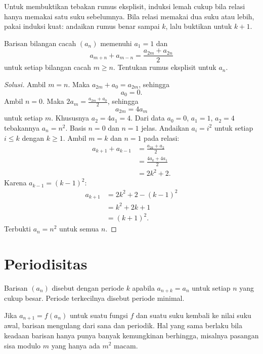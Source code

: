 \documentclass[12pt]{scrartcl}
\begin{document}
\begin{fact}
Untuk membuktikan tebakan rumus eksplisit, induksi lemah cukup bila relasi
hanya memakai satu suku sebelumnya. Bila relasi memakai dua suku atau lebih,
pakai induksi kuat: andaikan rumus benar sampai $k$, lalu buktikan untuk $k+1$.
\end{fact}

\begin{example}
Barisan bilangan cacah $(a_n)$ memenuhi $a_1 = 1$ dan
\[ a_{m+n} + a_{m-n} = \frac{a_{2m} + a_{2n}}{2} \]
untuk setiap bilangan cacah $m \ge n$. Tentukan rumus eksplisit untuk $a_n$.
\end{example}
\begin{proof}[Solusi]
\renewcommand{\qedsymbol}{$\blacksquare$}
Ambil $m = n$. Maka $a_{2m} + a_0 = a_{2m}$, sehingga
\[ a_0 = 0. \]
Ambil $n = 0$. Maka $2a_m = \frac{a_{2m} + a_0}{2}$, sehingga
\[ a_{2m} = 4a_m \]
untuk setiap $m$. Khususnya $a_2 = 4a_1 = 4$.
Dari data $a_0 = 0$, $a_1 = 1$, $a_2 = 4$ tebakannya $a_n = n^2$.
Basis $n = 0$ dan $n = 1$ jelas.
Andaikan $a_i = i^2$ untuk setiap $i \le k$ dengan $k \ge 1$.
Ambil $m = k$ dan $n = 1$ pada relasi:
\begin{align*}
a_{k+1} + a_{k-1} &= \frac{a_{2k} + a_2}{2} \\
&= \frac{4a_k + 4a_1}{2} \\
&= 2k^2 + 2.
\end{align*}
Karena $a_{k-1} = (k-1)^2$:
\begin{align*}
a_{k+1} &= 2k^2 + 2 - (k-1)^2 \\
&= k^2 + 2k + 1 \\
&= (k+1)^2.
\end{align*}
Terbukti $a_n = n^2$ untuk semua $n$.
\end{proof}

\newpage
\section{Periodisitas}

\begin{definition}
Barisan $(a_n)$ disebut  dengan
periode $k$ apabila $a_{n+k} = a_n$ untuk setiap $n$ yang cukup besar.
Periode terkecilnya disebut periode minimal.
\end{definition}

\begin{fact}
Jika $a_{n+1} = f(a_n)$ untuk suatu fungsi $f$ dan suatu suku kembali ke nilai
suku awal, barisan mengulang dari sana dan periodik. Hal yang sama berlaku bila
keadaan barisan hanya punya banyak kemungkinan berhingga, misalnya pasangan
sisa modulo $m$ yang hanya ada $m^2$ macam.
\end{fact}
\end{document}
